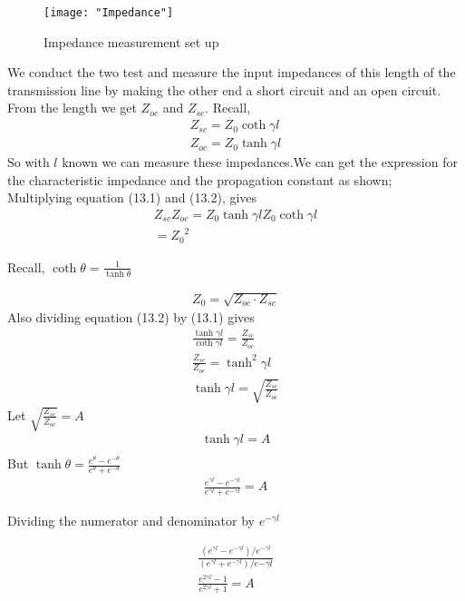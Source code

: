 \begin{figure}[h]
	\centering
	\texttt{[image: "Impedance"]}
	\caption{Impedance measurement set up}
\end{figure}
We conduct the two test and measure the input impedances of this length of the transmission line by making the other end a short circuit and an open circuit. From the length we get $Z
_{oc}$ and $Z_{sc}$. Recall,
\begin{align}
Z_{sc} = Z_0 \coth\gamma l\\
Z_{oc} = Z_0 \tanh\gamma l
\end{align}
So with $l$ known we can measure these impedances.We can get the expression for the characteristic impedance and the propagation constant as shown;\\
 Multiplying equation (13.1) and (13.2), gives
\begin{align*}
Z_{sc}Z_{oc} = Z_0\tanh\gamma l Z_0\coth\gamma l\\ = {Z_0}^2
\end{align*}
\begin{center}
	Recall, $\coth\theta = \frac{1}{\tanh\theta}$
\end{center}
\begin{align*}
Z_0 = \sqrt{Z_{oc}\cdot Z_{sc}}
\end{align*}
Also dividing equation (13.2) by (13.1) gives
\begin{align*}
\frac{\tanh\gamma l}{\coth\gamma l} = \frac{Z_{sc}}{Z_{oc}}\\
\frac{Z_{sc}}{Z_{oc}} = \tanh^2\gamma l\\
\tanh\gamma l = \sqrt{\frac{Z_{sc}}{Z_{oc}}}
\end{align*}
Let $\sqrt{\frac{Z_{sc}}{Z_{oc}}} = A$
\begin{align*}
	\tanh\gamma l = A\\
\end{align*}
But $\tanh \theta = \frac{e^\theta - e^{-\theta}}{e^\theta + e^{-\theta}}$
\begin{align*}
\frac{e^{\gamma l} - e^{-\gamma l}}{e^{\gamma l} + e^{-\gamma l}} = A
\end{align*}
\begin{center}
	Dividing the numerator and denominator by $e^{-\gamma l}$
\end{center}
\begin{align*}
\frac{(e^{\gamma l} - e^{-\gamma l})/e^{-\gamma l}}{(e^{\gamma l} + e^{-\gamma l})/e{-\gamma l}}\\
\frac{e^{2\gamma l} - 1}{e^{2\gamma l} + 1} = A
\end{align*}
